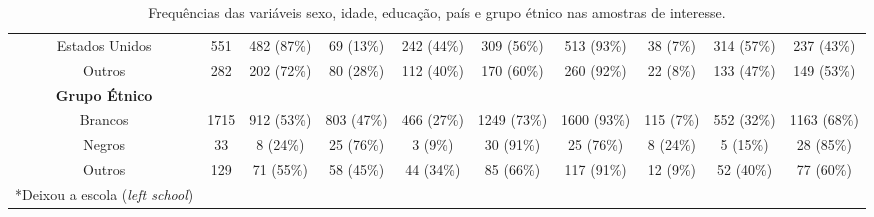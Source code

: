 \begin{landscape}
\begin{table}[h!]
\begin{tabular}{cccccccccc}
Estados Unidos & 551 & 482 (87\%) & 69 (13\%) & 242 (44\%) & 309 (56\%) & 513 (93\%) & 38 (7\%) & 314 (57\%) & 237 (43\%) \\
Outros & 282 & 202 (72\%) & 80 (28\%) & 112 (40\%) & 170 (60\%) & 260 (92\%) & 22 (8\%) & 133 (47\%) & 149 (53\%) \\ \cline{1-10}
\textbf{Grupo Étnico} & \multicolumn{1}{l}{} & \multicolumn{1}{l}{} & \multicolumn{1}{l}{} & \multicolumn{1}{l}{} & \multicolumn{1}{l}{} & \multicolumn{1}{l}{} & \multicolumn{1}{l}{} & \multicolumn{1}{l}{} & \multicolumn{1}{l}{} \\
Brancos & 1715 & 912 (53\%) & 803 (47\%) & 466 (27\%) & 1249 (73\%) & 1600 (93\%) & 115 (7\%) & 552 (32\%) & 1163 (68\%) \\
Negros & 33 & 8 (24\%) & 25 (76\%) & 3 (9\%) & 30 (91\%) & 25 (76\%) & 8 (24\%) & 5 (15\%) & 28 (85\%) \\
Outros & 129 & 71 (55\%) & 58 (45\%) & 44 (34\%) & 85 (66\%) & 117 (91\%) & 12 (9\%) & 52 (40\%) & 77 (60\%) \\ \cline{1-10}
*Deixou a escola (\emph{left school})  &
\end{tabular}
\caption{Frequências das variáveis sexo, idade, educação, país e grupo étnico nas amostras de interesse.}
\label{tabela_frequencias}
\end{table}
\end{landscape}
\pagestyle{plain}